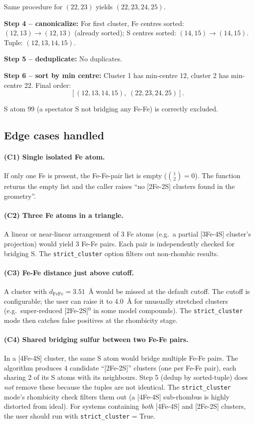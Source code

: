 \documentclass[10pt,a4paper,twoside]{article}
\newcommand{\fn}[1]{\texttt{#1}}
\newcommand{\cfgkey}[1]{\texttt{#1}}
\begin{document}
Same procedure for $(22, 23)$ yields $(22, 23, 24, 25)$.

\textbf{Step 4 -- canonicalize:}
For first cluster, Fe centres sorted: $(12, 13) \to (12, 13)$ (already
sorted); S centres sorted: $(14, 15) \to (14, 15)$.
Tuple: $(12, 13, 14, 15)$.

\textbf{Step 5 -- deduplicate:} No duplicates.

\textbf{Step 6 -- sort by min centre:} Cluster 1 has min-centre 12,
cluster 2 has min-centre 22. Final order:
\[
  \boxed{[(12, 13, 14, 15),\; (22, 23, 24, 25)]}.
\]

S atom 99 (a spectator S not bridging any Fe-Fe) is correctly
excluded.

\subsection{Edge cases handled}

\paragraph{(C1) Single isolated Fe atom.}
If only one Fe is present, the Fe-Fe-pair list is empty
($\binom{1}{2} = 0$). The function returns the empty list and the
caller raises ``no [2Fe-2S] clusters found in the geometry''.

\paragraph{(C2) Three Fe atoms in a triangle.}
A linear or near-linear arrangement of 3 Fe atoms (e.g.\ a partial
[3Fe-4S] cluster's projection) would yield 3 Fe-Fe pairs. Each
pair is independently checked for bridging S. The
\cfgkey{strict\_cluster} option filters out non-rhombic results.

\paragraph{(C3) Fe-Fe distance just above cutoff.}
A cluster with $d_\text{FeFe} = 3.51$~\AA{} would be missed at the
default cutoff. The cutoff is configurable; the user can raise it
to 4.0~\AA{} for unusually stretched clusters (e.g.\
super-reduced [2Fe-2S]$^0$ in some model compounds). The
\fn{strict\_cluster} mode then catches false positives at the
rhombicity stage.

\paragraph{(C4) Shared bridging sulfur between two Fe-Fe pairs.}
In a [4Fe-4S] cluster, the same S atom would bridge multiple
Fe-Fe pairs. The algorithm produces 4 candidate ``[2Fe-2S]''
clusters (one per Fe-Fe pair), each sharing 2 of its S atoms with
its neighbours. Step 5 (dedup by sorted-tuple) does \emph{not}
remove these because the tuples are not identical. The
\fn{strict\_cluster} mode's rhombicity check filters them out
(a [4Fe-4S] sub-rhombus is highly distorted from ideal). For
systems containing \emph{both} [4Fe-4S] and [2Fe-2S] clusters,
the user should run with \cfgkey{strict\_cluster} = True.
\end{document}

